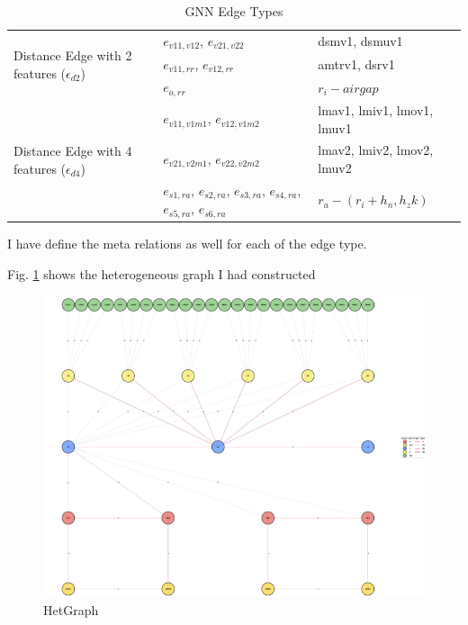 \documentclass{report} %
\begin{document}
\begin{enumerate}
\begin{table}[H]
\begin{tabular}{|p{}|p{}|p{}|}
        \hline
        \multirow{3}{0.2\textwidth}{Distance Edge with 2 features (\( \epsilon_{d2} \))} & \( e_{v11, v12} \), \( e_{v21, v22} \) & dsmv1, dsmuv1 \\
                                                                & \( e_{v11, rr} \), \( e_{v12, rr} \) & amtrv1, dsrv1 \\
                                                                & \( e_{o, rr} \) & $r_i - airgap$ \\

        \hline
        \multirow{3}{0.2\textwidth}{Distance Edge with 4 features (\( \epsilon_{d4} \))} & \( e_{v11, v1m1} \), \( e_{v12, v1m2} \) & lmav1, lmiv1, lmov1, lmuv1 \\
                                            &  \( e_{v21, v2m1} \), \( e_{v22, v2m2} \) & lmav2, lmiv2, lmov2, lmuv2 \\
                                            &  \( e_{s1, ra} \), \( e_{s2, ra} \), \( e_{s3, ra} \), \( e_{s4, ra} \), \( e_{s5, ra} \), \( e_{s6, ra} \)   &  \(r_a - (r_i + h_n, h_zk) \)\\

        \hline
        \end{tabular}
        \caption{\ac{GNN} Edge Types}
        \label{tab:GNN Edge Types}
    \end{table}

    I have define the meta relations as well for each of the edge type.

\end{enumerate}

Fig. \ref{fig:HetGraph} shows the heterogeneous graph I had constructed
\begin{figure}[H]
    \centering
    \includegraphics[width=1\textwidth]{./ReportImages/graph.png} 
    \caption{HetGraph}
    \label{fig:HetGraph}
\end{figure}
\end{document}
